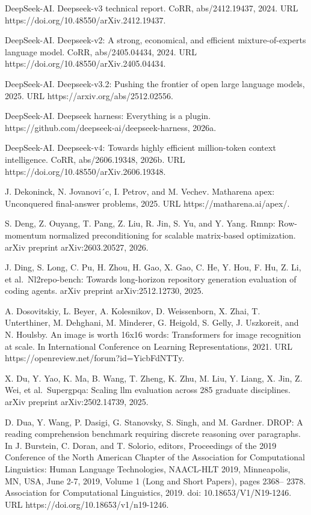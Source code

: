 DeepSeek-AI. Deepseek-v3 technical report. CoRR, abs/2412.19437, 2024.
URL https://doi.org/10.48550/arXiv.2412.19437.

DeepSeek-AI. Deepseek-v2: A strong, economical, and efficient
mixture-of-experts language model. CoRR, abs/2405.04434, 2024. URL
https://doi.org/10.48550/arXiv.2405.04434.

DeepSeek-AI. Deepseek-v3.2: Pushing the frontier of open large language
models, 2025. URL https://arxiv.org/abs/2512.02556.

DeepSeek-AI. Deepseek harness: Everything is a plugin.
https://github.com/deepseek-ai/deepseek-harness, 2026a.

DeepSeek-AI. Deepseek-v4: Towards highly efficient million-token context
intelligence. CoRR, abs/2606.19348, 2026b. URL
https://doi.org/10.48550/arXiv.2606.19348.

J. Dekoninck, N. Jovanovi´c, I. Petrov, and M. Vechev. Matharena apex:
Unconquered final-answer problems, 2025. URL https://matharena.ai/apex/.

S. Deng, Z. Ouyang, T. Pang, Z. Liu, R. Jin, S. Yu, and Y. Yang. Rmnp:
Row-momentum normalized preconditioning for scalable matrix-based
optimization. arXiv preprint arXiv:2603.20527, 2026.

J. Ding, S. Long, C. Pu, H. Zhou, H. Gao, X. Gao, C. He, Y. Hou, F. Hu,
Z. Li, et al.~Nl2repo-bench: Towards long-horizon repository generation
evaluation of coding agents. arXiv preprint arXiv:2512.12730, 2025.

A. Dosovitskiy, L. Beyer, A. Kolesnikov, D. Weissenborn, X. Zhai, T.
Unterthiner, M. Dehghani, M. Minderer, G. Heigold, S. Gelly, J.
Uszkoreit, and N. Houlsby. An image is worth 16x16 words: Transformers
for image recognition at scale. In International Conference on Learning
Representations, 2021. URL https://openreview.net/forum?id=YicbFdNTTy.

X. Du, Y. Yao, K. Ma, B. Wang, T. Zheng, K. Zhu, M. Liu, Y. Liang, X.
Jin, Z. Wei, et al.~Supergpqa: Scaling llm evaluation across 285
graduate disciplines. arXiv preprint arXiv:2502.14739, 2025.



D. Dua, Y. Wang, P. Dasigi, G. Stanovsky, S. Singh, and M. Gardner.
DROP: A reading comprehension benchmark requiring discrete reasoning
over paragraphs. In J. Burstein, C. Doran, and T. Solorio, editors,
Proceedings of the 2019 Conference of the North American Chapter of the
Association for Computational Linguistics: Human Language Technologies,
NAACL-HLT 2019, Minneapolis, MN, USA, June 2-7, 2019, Volume 1 (Long and
Short Papers), pages 2368-- 2378. Association for Computational
Linguistics, 2019. doi: 10.18653/V1/N19-1246. URL
https://doi.org/10.18653/v1/n19-1246.

